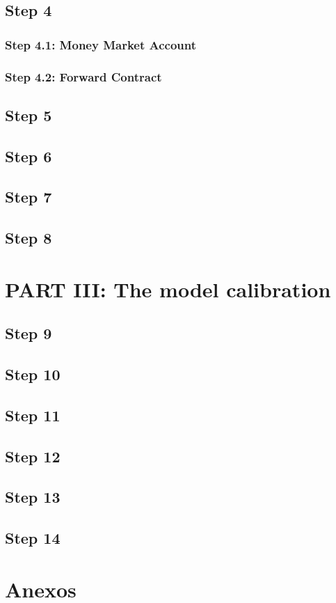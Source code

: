 \documentclass[12pt,a4paper]{article}
\begin{document}
\subsection{Step 4}

\subsubsection{Step 4.1: Money Market Account}

\subsubsection{Step 4.2: Forward Contract}

\subsection{Step 5}

\subsection{Step 6}

\subsection{Step 7}

\subsection{Step 8}

\section{PART III: The model calibration}

\subsection{Step 9}

\subsection{Step 10}

\subsection{Step 11}

\subsection{Step 12}

\subsection{Step 13}

\subsection{Step 14}


\clearpage
\section{Anexos}



\clearpage
\end{document}
